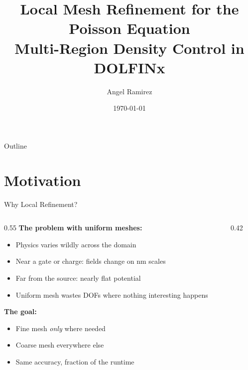 \documentclass[aspectratio=169]{beamer}
\title[Local Mesh Refinement --- Poisson Solver]{%
  Local Mesh Refinement for the Poisson Equation\\
  \large Multi-Region Density Control in DOLFINx}
\author{Angel Ramirez}
\date{\today}
\begin{document}
\begin{frame}
  \titlepage
\end{frame}

\begin{frame}{Outline}
  \tableofcontents
\end{frame}

\section{Motivation}

\begin{frame}{Why Local Refinement?}
  \begin{columns}
    \begin{column}{0.55\textwidth}
      \textbf{The problem with uniform meshes:}
      \begin{itemize}
        \item Physics varies wildly across the domain
        \item Near a gate or charge: fields change on nm scales
        \item Far from the source: nearly flat potential
        \item Uniform mesh wastes DOFs where nothing interesting happens
      \end{itemize}
      \vspace{0.8em}
      \textbf{The goal:}
      \begin{itemize}
        \item Fine mesh \emph{only} where needed
        \item Coarse mesh everywhere else
        \item Same accuracy, fraction of the runtime
      \end{itemize}
    \end{column}
    \begin{column}{0.42\textwidth}
    \end{column}
  \end{columns}
\end{frame}
\end{document}
